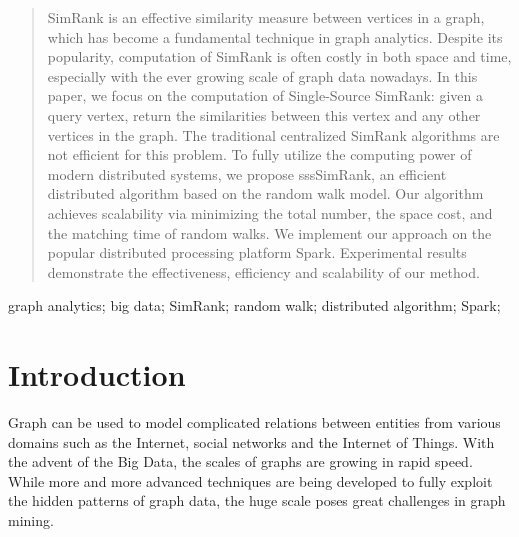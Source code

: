 \documentclass[conference]{IEEEtran}
\theoremstyle{definition}
\theoremstyle{definition}
\begin{document}
\maketitle

\begin{abstract}
 SimRank is an effective similarity measure between vertices in a graph, which has become a  fundamental technique in graph analytics. 
 Despite its popularity, computation of SimRank is often costly in both space and time, especially with the ever growing scale of graph data nowadays. 
 In this paper, we focus on the computation of Single-Source SimRank: given a query vertex, return the similarities between this vertex and any other vertices in the graph. 
 The traditional centralized SimRank algorithms are not efficient for this problem. 
 To fully utilize the computing power of modern distributed systems, we propose sssSimRank, an efficient distributed algorithm based on the random walk model.
 Our algorithm achieves scalability via minimizing the total number, the space cost, and the matching time of random walks.
We implement our approach on the popular distributed processing platform Spark.
Experimental results demonstrate the effectiveness, efficiency and scalability of our method.    

\end{abstract}


\begin{IEEEkeywords}
     graph analytics; big data; SimRank; random walk; distributed algorithm; Spark;
\end{IEEEkeywords}



%
\IEEEpeerreviewmaketitle


\section{Introduction}
Graph can be used to model complicated relations between entities from various domains such as the Internet, social networks and the Internet of Things. 
With the advent of the Big Data, the scales of graphs are growing in rapid speed. 
While more and more advanced techniques are being developed to fully exploit the hidden patterns of graph data, the huge scale poses great challenges in graph mining. 
\end{document}
